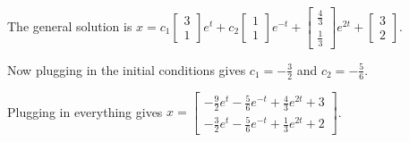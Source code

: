 \documentclass[../diffeq.tex]{subfiles}
\begin{document}
\begin{example}
    The general solution is $x=c_1\begin{bmatrix}
        3\\1
    \end{bmatrix}e^t+c_2\begin{bmatrix}
        1\\1
    \end{bmatrix}e^{-t}+\begin{bmatrix}
        \frac{4}{3}\\
        \frac{1}{3}
    \end{bmatrix}e^{2t}+\begin{bmatrix}
        3\\2
    \end{bmatrix}$.

    Now plugging in the initial conditions gives $c_1=-\frac{3}{2}$ and $c_2=-\frac{5}{6}$.

    Plugging in everything gives $x=\begin{bmatrix}
        -\frac{9}{2}e^t-\frac{5}{6}e^{-t}+\frac{4}{3}e^{2t}+3\\
        -\frac{3}{2}e^{t}-\frac{5}{6}e^{-t}+\frac{1}{3}e^{2t}+2
    \end{bmatrix}$.
\end{example}
\end{document}
